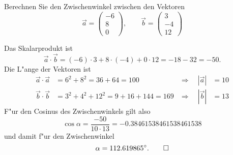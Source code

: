 Berechnen Sie den Zwischenwinkel zwischen den Vektoren
\[
\vec a
=
\begin{pmatrix}-6\\8\\0\end{pmatrix}
,\qquad
\vec b
=
\begin{pmatrix}3\\-4\\12\end{pmatrix}
\]

\begin{loesung}
Das Skalarprodukt ist
\[
\vec a\cdot\vec b=(-6)\cdot 3+8\cdot(-4)+0\cdot 12=-18-32=-50.
\]
Die L"ange der Vektoren ist
\begin{align*}
\vec a\cdot\vec a&=6^2+8^2=36+64=100&\Rightarrow\quad|\vec a|&=10\\
\vec b\cdot\vec b&=3^2+4^2+12^2=9+16+144=169&\Rightarrow\quad|\vec b|&=13
\end{align*}
F"ur den Cosinus des Zwischenwinkels gilt also
\[
\cos \alpha=\frac{-50}{10\cdot 13}=-0.38461538461538461538
\]
und damit f"ur den Zwischenwinkel
\[
\alpha=112.619865^\circ.
\qedhere
\]
\end{loesung}

